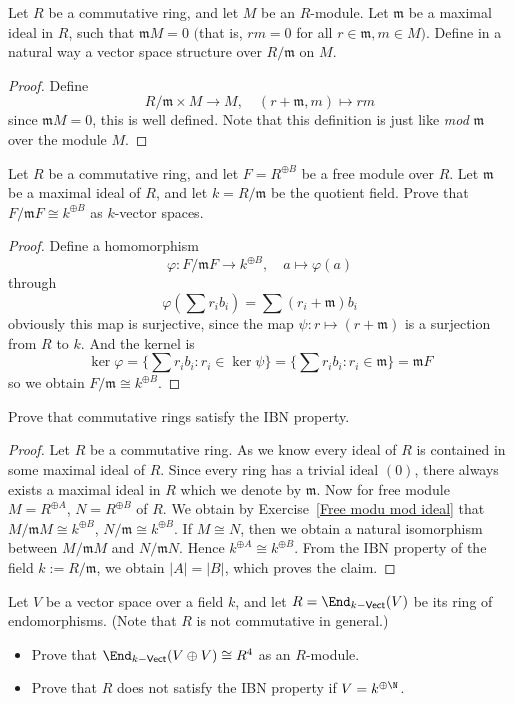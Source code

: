 \begin{exercise}
Let $R$ be a commutative ring, and let $M$ be an $R$-module. Let $\mathfrak{m}$ be a maximal ideal in $R$, such that $\mathfrak{m}M=0$ $($that is, $rm=0$ for all $r\in\mathfrak{m},m\in M$$)$.
Define in a natural way a vector space structure over $R/\mathfrak{m}$ on $M$.
\end{exercise}
\begin{proof}
Define 
\[R/\mathfrak{m}\times M\to M,\quad (r+\mathfrak{m},m)\mapsto rm\]
since $\mathfrak{m}M=0$, this is well defined. Note that this definition is just like \textit{mod} $\mathfrak{m}$ over the module $M$. 
\end{proof}
\begin{exercise}\label{Free modu mod ideal}
Let $R$ be a commutative ring, and let $F=R^{\oplus B}$ be a free module over $R$. Let $\mathfrak{m}$ be a maximal ideal of $R$, and let $k=R/\mathfrak{m}$ be the quotient field. Prove that $F/\mathfrak{m}F\cong k^{\oplus B}$ as $k$-vector spaces.
\end{exercise}
\begin{proof}
Define a homomorphism 
\[\varphi:F/\mathfrak{m}F\to k^{\oplus B},\quad a\mapsto\varphi(a)\]
through
\[\varphi(\sum r_ib_i)=\sum (r_i+\mathfrak{m})b_i\]
obviously this map is surjective, since the map $\psi:r\mapsto(r+\mathfrak{m})$ is a surjection from $R$ to $k$. And the kernel is
\[\ker\varphi=\big\{\sum r_ib_i: r_i\in\ker\psi\big\}=\big\{\sum r_ib_i:r_i\in\mathfrak{m}\big\}=\mathfrak{m}F\]
so we obtain $F/\mathfrak{m}\cong k^{\oplus B}$.
\end{proof}
\begin{exercise}
Prove that commutative rings satisfy the IBN property.
\end{exercise}
\begin{proof}
Let $R$ be a commutative ring. As we know every ideal of $R$ is contained in some maximal ideal of $R$. Since every ring has a trivial ideal $(0)$, there always exists a maximal ideal in $R$ which we denote by $\mathfrak{m}$. Now for free module $M=R^{\oplus A}$, $N=R^{\oplus B}$ of $R$. We obtain by Exercise~\ref{Free modu mod ideal} that $M/\mathfrak{m}M\cong k^{\oplus B}$, $N/\mathfrak{m}\cong k^{\oplus B}$. If $M\cong N$, then we obtain a natural isomorphism between $M/\mathfrak{m}M$ and $N/\mathfrak{m}N$. Hence $k^{\oplus A}\cong k^{\oplus B}$. From the IBN property of the field $k:=R/\mathfrak{m}$, we obtain $|A|=|B|$, which proves the claim. 
\end{proof}
\begin{exercise}
Let $V$ be a vector space over a field $k$, and let $R=\End_{k-\mathsf{Vect}}(V)$ be its ring of endomorphisms. (Note that $R$ is not commutative in general.)
\begin{itemize}
\item Prove that $\End_{k-\mathsf{Vect}}(V\oplus V)\cong R^4$ as an $R$-module.
\item Prove that $R$ does not satisfy the IBN property if $V=k^{\oplus\N}$.
\end{itemize}
\end{exercise}
